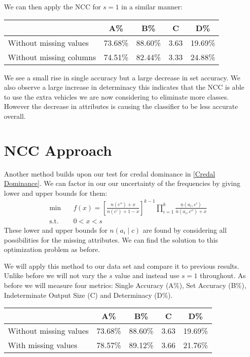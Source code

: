 We can then apply the NCC for $s=1$ in a similar manner:
\begin{center}
\begin{tabular}{l|c c c c}
	                        &   A\%   &   B\%   &  C   &   D\%   \\
	\hline
	Without missing values  & 73.68\% & 88.60\% & 3.63 & 19.69\% \\
	Without missing columns & 74.51\% & 82.44\% & 3.33 & 24.88\% \\
\end{tabular}
\end{center}

We see a small rise in single accuracy but a large decrease in set accuracy.
We also observe a large increase in determinacy this indicates that the NCC is able to use the extra vehicles we are now considering to eliminate more classes.
However the decrease in attributes is causing the classifier to be less accurate overall.

\section{NCC Approach}

Another method builds upon our test for credal dominance in \cref{Credal Dominance}.
We can factor in our our uncertainty of the frequencies by giving lower and upper bounds for them:
\begin{align}
	\min \quad & f(x) = \left[ \frac{n(c'') + x}{n(c') + 1 - x} \right]^{k-1} \prod_{i=1}^k \frac{\underline{n}(a_i, c')}{\overline{n}(a_i, c'') + x} \\
	\text{s.t.} \quad & 0 < x < s
\end{align}
These lower and upper bounds for $n(a_i \mid c)$ are found by considering all possibilities for the missing attributes.
We can find the solution to this optimization problem as before.

We will apply this method to our data set and compare it to previous results.
Unlike before we will not vary the $s$ value and instead use $s=1$ throughout.
As before we will measure four metrics: Single Accuracy (A\%), Set Accuracy (B\%), Indeterminate Output Size (C) and Determinacy (D\%).

\begin{center}
\begin{tabular}{l|c c c c}
	                       & A\%     & B\%     & C    & D\%     \\
	\hline
	Without missing values & 73.68\% & 88.60\% & 3.63 & 19.69\% \\
	With missing values    & 78.57\% & 89.12\% & 3.66 & 21.76\% \\
\end{tabular}
\end{center}

